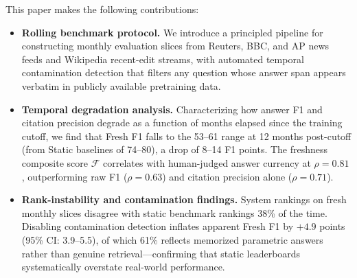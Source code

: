 This paper makes the following contributions:
\begin{itemize}
  \item \textbf{Rolling benchmark protocol.} We introduce a principled pipeline for constructing monthly evaluation slices from Reuters, BBC, and AP news feeds and Wikipedia recent-edit streams, with automated temporal contamination detection that filters any question whose answer span appears verbatim in publicly available pretraining data.
  \item \textbf{Temporal degradation analysis.} Characterizing how answer F1 and citation precision degrade as a function of months elapsed since the training cutoff, we find that Fresh F1 falls to the 53--61 range at 12 months post-cutoff (from Static baselines of 74--80), a drop of 8--14 F1 points. The freshness composite score $\mathcal{F}$ correlates with human-judged answer currency at $\rho{=}0.81$, outperforming raw F1 ($\rho{=}0.63$) and citation precision alone ($\rho{=}0.71$).
  \item \textbf{Rank-instability and contamination findings.} System rankings on fresh monthly slices disagree with static benchmark rankings 38\% of the time. Disabling contamination detection inflates apparent Fresh F1 by $+4.9$ points (95\% CI: 3.9--5.5), of which 61\% reflects memorized parametric answers rather than genuine retrieval---confirming that static leaderboards systematically overstate real-world performance.
\end{itemize}
